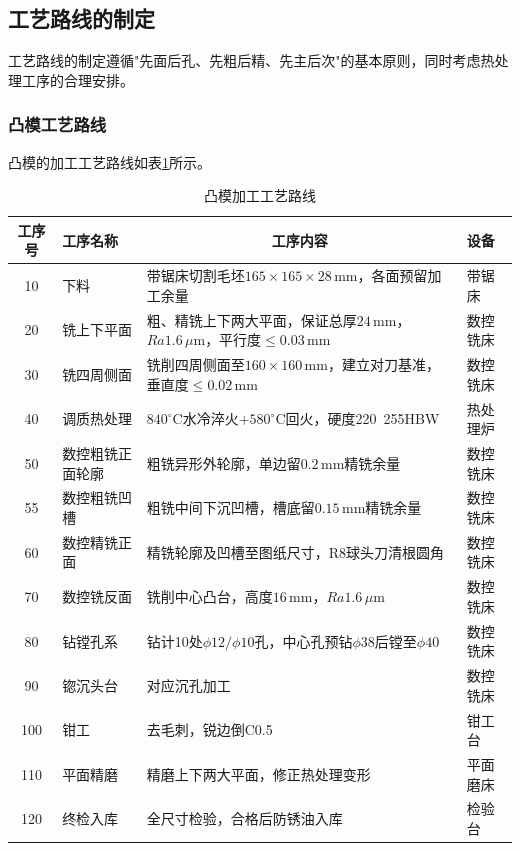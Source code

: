 \documentclass{xautCADreport}
\begin{document}
\subsection{工艺路线的制定}

工艺路线的制定遵循"先面后孔、先粗后精、先主后次"的基本原则，同时考虑热处理工序的合理安排。

\subsubsection{凸模工艺路线}

凸模的加工工艺路线如表\ref{tab:route_punch}所示。

\begin{table}[H]
  \centering
  \caption{凸模加工工艺路线}
  \label{tab:route_punch}
  \small
  \begin{tabular}{clp{7.5cm}l}
    \toprule
    工序号 & 工序名称 & \multicolumn{1}{c}{工序内容} & 设备 \\
    \midrule
    10 & 下料 & 带锯床切割毛坯$165\times165\times28\,\mathrm{mm}$，各面预留加工余量 & 带锯床 \\
    20 & 铣上下平面 & 粗、精铣上下两大平面，保证总厚$24\,\mathrm{mm}$，$Ra1.6\,\mu\mathrm{m}$，平行度$\leq0.03\,\mathrm{mm}$ & 数控铣床 \\
    30 & 铣四周侧面 & 铣削四周侧面至$160\times160\,\mathrm{mm}$，建立对刀基准，垂直度$\leq0.02\,\mathrm{mm}$ & 数控铣床 \\
    40 & 调质热处理 & $840^{\circ}\mathrm{C}$水冷淬火$+580^{\circ}\mathrm{C}$回火，硬度220~255HBW & 热处理炉 \\
    50 & 数控粗铣正面轮廓 & 粗铣异形外轮廓，单边留$0.2\,\mathrm{mm}$精铣余量 & 数控铣床 \\
    55 & 数控粗铣凹槽 & 粗铣中间下沉凹槽，槽底留$0.15\,\mathrm{mm}$精铣余量 & 数控铣床 \\
    60 & 数控精铣正面 & 精铣轮廓及凹槽至图纸尺寸，R8球头刀清根圆角 & 数控铣床 \\
    70 & 数控铣反面 & 铣削中心凸台，高度$16\,\mathrm{mm}$，$Ra1.6\,\mu\mathrm{m}$ & 数控铣床 \\
    80 & 钻镗孔系 & 钻计10处$\phi12/\phi10$孔，中心孔预钻$\phi38$后镗至$\phi40$ & 数控铣床 \\
    90 & 锪沉头台 & 对应沉孔加工 & 数控铣床 \\
    100 & 钳工 & 去毛刺，锐边倒C0.5 & 钳工台 \\
    110 & 平面精磨 & 精磨上下两大平面，修正热处理变形 & 平面磨床 \\
    120 & 终检入库 & 全尺寸检验，合格后防锈油入库 & 检验台 \\
    \bottomrule
  \end{tabular}
\end{table}
\end{document}
